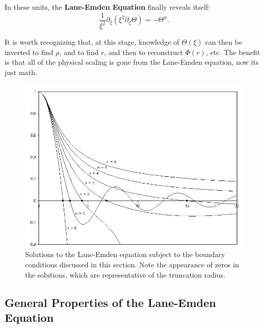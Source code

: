 In these units, the \textbf{Lane-Emden Equation} finally reveals itself:
\begin{equation}
    \label{eq:Lane-Emden}
    \boxed{
    \frac{1}{\xi^2} \partial_\xi \left(\xi^2 \partial_\xi \Theta\right) = - \Theta^n.
    }
\end{equation}
\begin{remark}
    It is worth recognizing that, at this stage, knowledge of $\Theta(\xi)$ can then be inverted to find $\rho$, and to find $r$, and then to reconstruct $\Phi(r)$, etc. The benefit is that all of the physical scaling is gone from the Lane-Emden equation, now its just math.
\end{remark}
\begin{figure}[ht!]
    \centering
    \includegraphics[width=0.75\linewidth]{Pictures/figures/Lane-emden.jpeg}
    \caption{Solutions to the Lane-Emden equation subject to the boundary conditions discussed in this section. Note the appearance of zeros in the solutions, which are representative of the truncation radius.}
    \label{fig:lane-emden}
\end{figure}
\subsection{General Properties of the Lane-Emden Equation}

